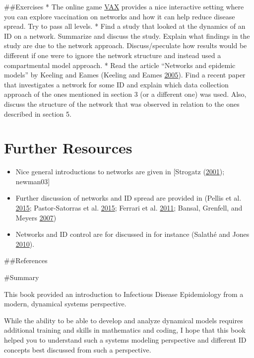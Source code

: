 \documentclass[]{book}
\providecommand{\tightlist}{%
  \setlength{\itemsep}{0pt}\setlength{\parskip}{0pt}}
\theoremstyle{definition}
\theoremstyle{definition}
\theoremstyle{definition}
\theoremstyle{remark}
\begin{document}
\#\#Exercises * The online game \href{http://vax.herokuapp.com/}{VAX}
provides a nice interactive setting where you can explore vaccination on
networks and how it can help reduce disease spread. Try to pass all
levels. * Find a study that looked at the dynamics of an ID on a
network. Summarize and discuss the study. Explain what findings in the
study are due to the network approach. Discuss/speculate how results
would be different if one were to ignore the network structure and
instead used a compartmental model approach. * Read the article
``Networks and epidemic models'' by Keeling and Eames (Keeling and Eames
\protect\hyperlink{ref-keeling05}{2005}). Find a recent paper that
investigates a network for some ID and explain which data collection
approach of the ones mentioned in section 3 (or a different one) was
used. Also, discuss the structure of the network that was observed in
relation to the ones described in section 5.

\hypertarget{further-resources-11}{%
\section{Further Resources}\label{further-resources-11}}

\begin{itemize}
\tightlist
\item
  Nice general introductions to networks are given in {[}Strogatz
  (\protect\hyperlink{ref-strogatz01}{2001}); newman03{]}
\item
  Further discussion of networks and ID spread are provided in (Pellis
  et al. \protect\hyperlink{ref-pellis15}{2015}; Pastor-Satorras et al.
  \protect\hyperlink{ref-pastor-satorras15}{2015}; Ferrari et al.
  \protect\hyperlink{ref-ferrari11}{2011}; Bansal, Grenfell, and Meyers
  \protect\hyperlink{ref-bansal07}{2007})
\item
  Networks and ID control are for discussed in for instance (Salathé and
  Jones \protect\hyperlink{ref-salathe10}{2010}).
\end{itemize}

\#\#References

\#Summary

This book provided an introduction to Infectious Disease Epidemiology
from a modern, dynamical systems perspective.

While the ability to be able to develop and analyze dynamical models
requires additional training and skills in mathematics and coding, I
hope that this book helped you to understand such a systems modeling
perspective and different ID concepts best discussed from such a
perspective.
\end{document}
